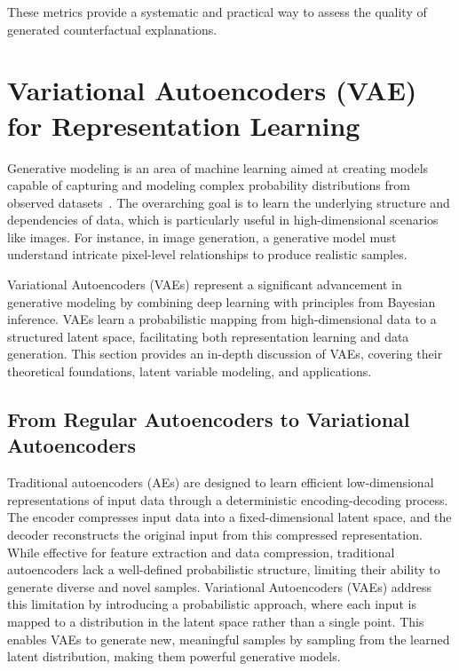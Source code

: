 These metrics provide a systematic and practical way to assess the quality of generated counterfactual explanations.





















\section{Variational Autoencoders (VAE) for Representation Learning}
Generative modeling is an area of machine learning aimed at creating models capable of capturing and modeling complex probability distributions from observed datasets~\cite{doersch2016tutorial}. The overarching goal is to learn the underlying structure and dependencies of data, which is particularly useful in high-dimensional scenarios like images. For instance, in image generation, a generative model must understand intricate pixel-level relationships to produce realistic samples.

Variational Autoencoders (VAEs) represent a significant advancement in generative modeling by combining deep learning with principles from Bayesian inference. VAEs learn a probabilistic mapping from high-dimensional data to a structured latent space, facilitating both representation learning and data generation. This section provides an in-depth discussion of VAEs, covering their theoretical foundations, latent variable modeling, and applications.

\subsection{From Regular Autoencoders to Variational Autoencoders}
Traditional autoencoders (AEs) are designed to learn efficient low-dimensional representations of input data through a deterministic encoding-decoding process. The encoder compresses input data into a fixed-dimensional latent space, and the decoder reconstructs the original input from this compressed representation. While effective for feature extraction and data compression, traditional autoencoders lack a well-defined probabilistic structure, limiting their ability to generate diverse and novel samples. Variational Autoencoders (VAEs) address this limitation by introducing a probabilistic approach, where each input is mapped to a distribution in the latent space rather than a single point. This enables VAEs to generate new, meaningful samples by sampling from the learned latent distribution, making them powerful generative models.

